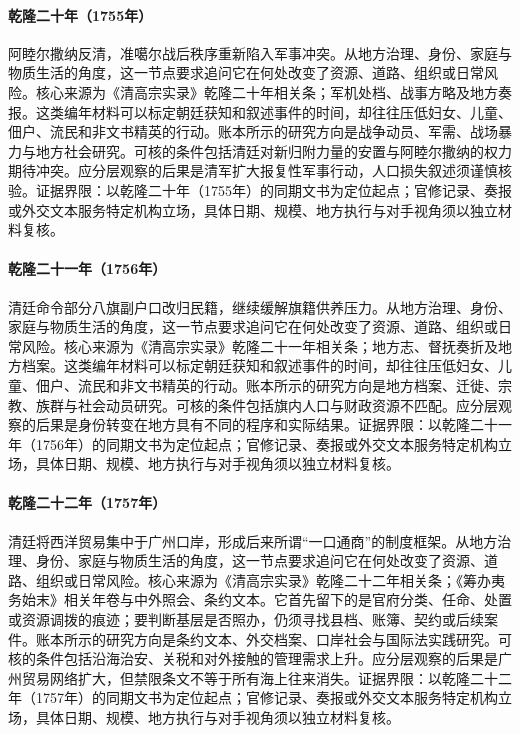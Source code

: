 \hypertarget{social:EQ-1755-AMURSANA-REVOLT}{}\paragraph{乾隆二十年（1755年）}阿睦尔撒纳反清，准噶尔战后秩序重新陷入军事冲突。从地方治理、身份、家庭与物质生活的角度，这一节点要求追问它在何处改变了资源、道路、组织或日常风险。核心来源为《清高宗实录》乾隆二十年相关条；军机处档、战事方略及地方奏报。这类编年材料可以标定朝廷获知和叙述事件的时间，却往往压低妇女、儿童、佃户、流民和非文书精英的行动。账本所示的研究方向是战争动员、军需、战场暴力与地方社会研究。可核的条件包括清廷对新归附力量的安置与阿睦尔撒纳的权力期待冲突。应分层观察的后果是清军扩大报复性军事行动，人口损失叙述须谨慎核验。证据界限：以乾隆二十年（1755年）的同期文书为定位起点；官修记录、奏报或外交文本服务特定机构立场，具体日期、规模、地方执行与对手视角须以独立材料复核。
\hypertarget{social:EQ-1756-BANNER-CIVILIAN-REGISTRATION}{}\paragraph{乾隆二十一年（1756年）}清廷命令部分八旗副户口改归民籍，继续缓解旗籍供养压力。从地方治理、身份、家庭与物质生活的角度，这一节点要求追问它在何处改变了资源、道路、组织或日常风险。核心来源为《清高宗实录》乾隆二十一年相关条；地方志、督抚奏折及地方档案。这类编年材料可以标定朝廷获知和叙述事件的时间，却往往压低妇女、儿童、佃户、流民和非文书精英的行动。账本所示的研究方向是地方档案、迁徙、宗教、族群与社会动员研究。可核的条件包括旗内人口与财政资源不匹配。应分层观察的后果是身份转变在地方具有不同的程序和实际结果。证据界限：以乾隆二十一年（1756年）的同期文书为定位起点；官修记录、奏报或外交文本服务特定机构立场，具体日期、规模、地方执行与对手视角须以独立材料复核。
\hypertarget{social:EQ-1757-CANTON-TRADE-RESTRICTION}{}\paragraph{乾隆二十二年（1757年）}清廷将西洋贸易集中于广州口岸，形成后来所谓“一口通商”的制度框架。从地方治理、身份、家庭与物质生活的角度，这一节点要求追问它在何处改变了资源、道路、组织或日常风险。核心来源为《清高宗实录》乾隆二十二年相关条；《筹办夷务始末》相关年卷与中外照会、条约文本。它首先留下的是官府分类、任命、处置或资源调拨的痕迹；要判断基层是否照办，仍须寻找县档、账簿、契约或后续案件。账本所示的研究方向是条约文本、外交档案、口岸社会与国际法实践研究。可核的条件包括沿海治安、关税和对外接触的管理需求上升。应分层观察的后果是广州贸易网络扩大，但禁限条文不等于所有海上往来消失。证据界限：以乾隆二十二年（1757年）的同期文书为定位起点；官修记录、奏报或外交文本服务特定机构立场，具体日期、规模、地方执行与对手视角须以独立材料复核。
